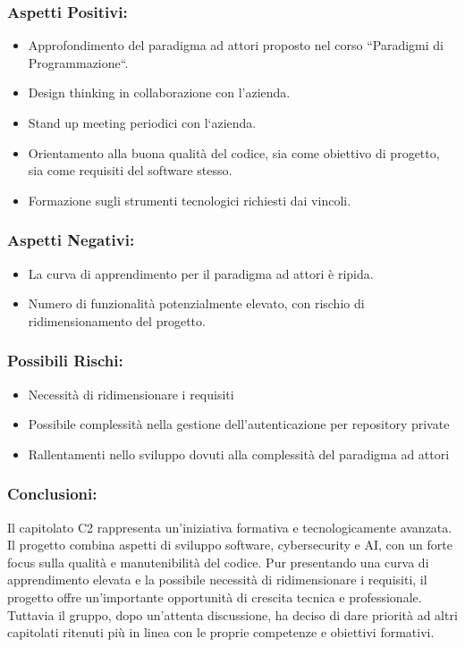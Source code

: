 \documentclass[a4paper,12pt]{article}
\begin{document}
\subsubsection*{Aspetti Positivi:}
\begin{itemize}
    \item Approfondimento del paradigma ad attori proposto nel corso ``Paradigmi di
          Programmazione``.
    \item Design thinking in collaborazione con l'azienda.
    \item Stand up meeting periodici con l`azienda.
    \item Orientamento alla buona qualità del codice, sia come obiettivo di progetto, sia
          come requisiti del software stesso.
    \item Formazione sugli strumenti tecnologici richiesti dai vincoli.
\end{itemize}

\subsubsection*{Aspetti Negativi:}
\begin{itemize}
    \item La curva di apprendimento per il paradigma ad attori è ripida.
    \item Numero di funzionalità potenzialmente elevato, con rischio di ridimensionamento
          del progetto.
\end{itemize}
\subsubsection*{Possibili Rischi:}
\begin{itemize}
    \item Necessità di ridimensionare i requisiti
    \item Possibile complessità nella gestione dell'autenticazione per repository private
    \item Rallentamenti nello sviluppo dovuti alla complessità del paradigma ad attori
\end{itemize}

\subsubsection*{Conclusioni:}
Il capitolato C2 rappresenta un'iniziativa formativa e tecnologicamente avanzata. Il progetto combina aspetti di sviluppo software, cybersecurity e AI, con un forte focus sulla qualità e manutenibilità del codice.
Pur presentando una curva di apprendimento elevata e la possibile necessità di ridimensionare i requisiti, il progetto offre un'importante opportunità di crescita tecnica e professionale. Tuttavia il gruppo, dopo un'attenta discussione, ha deciso di dare priorità ad altri capitolati ritenuti più in linea con le proprie competenze e obiettivi formativi.
\vspace{2.0cm}
\end{document}
